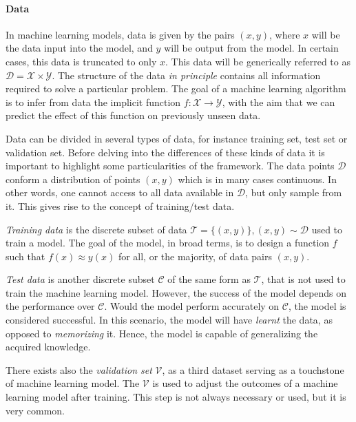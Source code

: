 \documentclass[]{report}
\begin{document}
\paragraph{Data}

    In machine learning models, data is given by the pairs $(x, y)$, where $x$ will be the data input into the model, and $y$ will be output from the model. In certain cases, this data is truncated to only $x$. This data will be generically referred to as $\mathcal D = \mathcal X \times \mathcal Y$. The structure of the data \textit{in principle} contains all information required to solve a particular problem. The goal of a machine learning algorithm is to infer from data the implicit function $f : \mathcal X \rightarrow \mathcal Y$, with the aim that we can predict the effect of this function on previously unseen data. 

    Data can be divided in several types of data, for instance training set, test set or validation set. Before delving into the differences of these kinds of data it is important to highlight some particularities of the framework. The data points $\mathcal D$ conform a distribution of points $(x,y)$ which is in many cases continuous. In other words, one cannot access to all data available in $\mathcal D$, but only sample from it. This gives rise to the concept of training/test data. 

    \textit{Training data} is the discrete subset of data $\mathcal T = \{ (x, y)\}, (x,y) \sim \mathcal D$ used to train a model. The goal of the model, in broad terms, is to design a function $f$ such that $f(x) \approx y(x)$ for all, or the majority, of data pairs $(x, y)$. 

    \textit{Test data} is another discrete subset $\mathcal C$ of the same form as $\mathcal T$, that is not used to train the machine learning model. However, the success of the model depends on the performance over $\mathcal C$. Would the model perform accurately on $\mathcal C$, the model is considered successful. In this scenario, the model will have \textit{learnt} the data, as opposed to \textit{memorizing} it. Hence, the model is capable of generalizing the acquired knowledge. 

    There exists also the \textit{validation set} $\mathcal V$, as a third dataset serving as a touchstone of machine learning model. The $\mathcal V$ is used to adjust the outcomes of a machine learning model after training. This step is not always necessary or used, but it is very common. 
\end{document}
